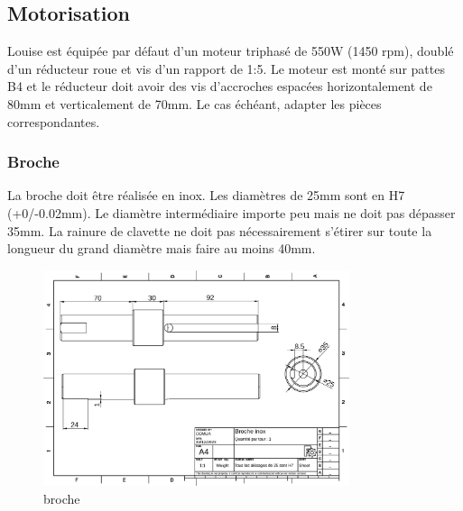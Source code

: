 \documentclass[a4paper]{article}
\begin{document}
\subsection{Motorisation}
Louise est équipée par défaut d'un moteur triphasé de 550W (1450 rpm), doublé d'un réducteur roue et vis d'un rapport 
de 1:5. Le moteur est monté sur pattes B4 et le réducteur doit avoir des vis d'accroches espacées horizontalement de 80mm
et verticalement de 70mm. Le cas échéant, adapter les pièces correspondantes. 

\subsubsection{Broche}
La broche doit être réalisée en inox. Les diamètres de 25mm sont en H7 (+0/-0.02mm). Le diamètre intermédiaire importe peu mais ne doit pas
dépasser 35mm. La rainure de clavette ne doit pas nécessairement s'étirer sur toute la longueur du grand diamètre mais faire au moins 40mm. 
\begin{figure}[H]
    \centering
    \includegraphics*[width=0.8\textwidth]{../plans/broche}
    \caption{broche}
    \label{fig:base}
\end{figure}
\end{document}
